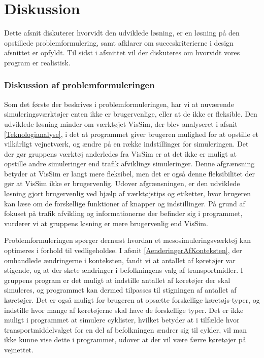 \chapter{Diskussion}



Dette afsnit diskuterer hvorvidt den udviklede løsning, er en løsning på den opstillede problemformulering, samt afklarer om succeskriterierne i design afsnittet er opfyldt. Til sidst i afsnittet vil der diskuteres om hvorvidt vores program er realistisk.

\subsection{Diskussion af problemformuleringen}\label{diskproblem}
Som det første der beskrives i problemformuleringen, har vi at nuværende simuleringsværktøjer enten ikke er brugervenlige, eller at de ikke er fleksible. Den udviklede løsning minder om værktøjet VisSim, der blev analyseret i afsnit \ref{Teknologianalyse}, i det at programmet giver brugeren mulighed for at opstille et vilkårligt vejnetværk, og ændre på en række indstillinger for simuleringen. Det der gør gruppens værktøj anderledes fra VisSim er at det ikke er muligt at opstille andre simuleringer end trafik afviklings simuleringer. Denne afgrænsning betyder at VisSim er langt mere fleksibel, men det er også denne fleksibilitet der gør at VisSim ikke er brugervenlig. Udover afgrænsningen, er den udviklede løsning gjort brugervenlig ved hjælp af værktøjstips og etiketter, hvor brugeren kan læse om de forskellige funktioner af knapper og indstillinger. På grund af fokuset på trafik afvikling og informationerne der befinder sig i programmet, vurderer vi at gruppens løsning er mere brugervenlig end VisSim.

\vspace{5mm}
Problemformuleringen spørger dernæst hvordan et mesosimuleringsværktøj kan optimeres i forhold til vedligeholdse. I afsnit \ref{AenderingerAfKonteksten}, der omhandlede ændringerne i konteksten, fandt vi at antallet af køretøjer var stigende, og at der skete ændringer i befolkningens valg af transportmidler. I gruppens program er det muligt at indstille antallet af køretøjer der skal simuleres, og programmet kan dermed tilpasses til stigningen af antallet af køretøjer. Det er også muligt for brugeren at opsætte forskellige køretøjs-typer, og indstille hvor mange af køretøjerne skal have de forskellige typer. Det er ikke muligt i programmet at simulere cyklister, hvilket betyder at i tilfælde hvor transportmiddelvalget for en del af befolkningen ændrer sig til cykler, vil man ikke kunne vise dette i programmet, udover at der vil være færre køretøjer på vejnettet. 

